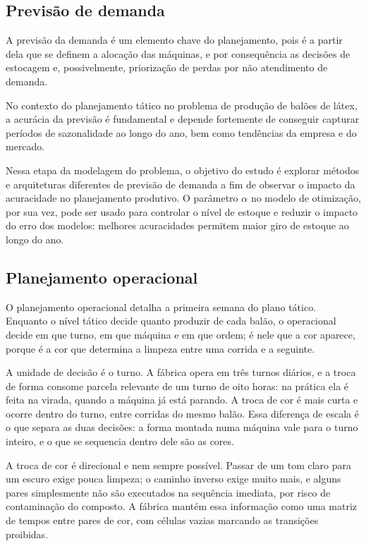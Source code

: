 \documentclass[fleqn,12pt,a4paper]{article}
\begin{document}
\subsection{Previsão de demanda}

A previsão da demanda é um elemento chave do planejamento, pois é a partir dela que se definem a alocação das máquinas, e por consequência as decisões de estocagem e, possivelmente, priorização de perdas por não atendimento de demanda.

No contexto do planejamento tático no problema de produção de balões de látex, a acurácia da previsão é fundamental e depende fortemente de conseguir capturar períodos de sazonalidade ao longo do ano, bem como tendências da empresa e do mercado.

Nessa etapa da modelagem do problema, o objetivo do estudo é explorar métodos e arquiteturas diferentes de previsão de demanda a fim de observar o impacto da acuracidade no planejamento produtivo. O parâmetro $\alpha$ no modelo de otimização, por sua vez, pode ser usado para controlar o nível de estoque e reduzir o impacto do erro dos modelos: melhores acuracidades permitem maior giro de estoque ao longo do ano.


\subsection{Planejamento operacional}

O planejamento operacional detalha a primeira semana do plano tático. Enquanto o nível tático decide quanto produzir de cada balão, o operacional decide em que turno, em que máquina e em que ordem; é nele que a cor aparece, porque é a cor que determina a limpeza entre uma corrida e a seguinte.

A unidade de decisão é o turno. A fábrica opera em três turnos diários, e a troca de forma consome parcela relevante de um turno de oito horas: na prática ela é feita na virada, quando a máquina já está parando. A troca de cor é mais curta e ocorre dentro do turno, entre corridas do mesmo balão. Essa diferença de escala é o que separa as duas decisões: a forma montada numa máquina vale para o turno inteiro, e o que se sequencia dentro dele são as cores.

A troca de cor é direcional e nem sempre possível. Passar de um tom claro para um escuro exige pouca limpeza; o caminho inverso exige muito mais, e alguns pares simplesmente não são executados na sequência imediata, por risco de contaminação do composto. A fábrica mantém essa informação como uma matriz de tempos entre pares de cor, com células vazias marcando as transições proibidas.
\end{document}
